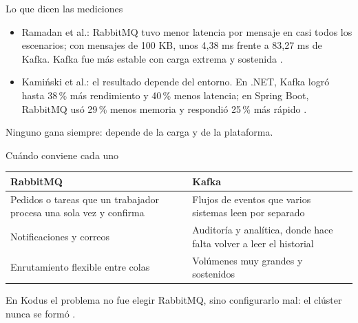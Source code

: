 \begin{frame}{Lo que dicen las mediciones}
  \begin{itemize}
    \item Ramadan et al.: RabbitMQ tuvo menor latencia por mensaje en casi todos los escenarios; con mensajes de 100 KB, unos 4,38 ms frente a 83,27 ms de Kafka. Kafka fue más estable con carga extrema y sostenida \cite{rias2026kafka}.
    \item Kamiński et al.: el resultado depende del entorno. En .NET, Kafka logró hasta 38\,\% más rendimiento y 40\,\% menos latencia; en Spring Boot, RabbitMQ usó 29\,\% menos memoria y respondió 25\,\% más rápido \cite{kaminski2025rabbitmq}.
  \end{itemize}
  \vspace{0.3cm}
  Ninguno gana siempre: depende de la carga y de la plataforma.
\end{frame}

\begin{frame}{Cuándo conviene cada uno}
  \begin{tabularx}{\textwidth}{XX}
    \toprule
    RabbitMQ & Kafka \\
    \midrule
    Pedidos o tareas que un trabajador procesa una sola vez y confirma & Flujos de eventos que varios sistemas leen por separado \\
    Notificaciones y correos & Auditoría y analítica, donde hace falta volver a leer el historial \\
    Enrutamiento flexible entre colas & Volúmenes muy grandes y sostenidos \\
    \bottomrule
  \end{tabularx}
  \vspace{0.3cm}
  {\small En Kodus el problema no fue elegir RabbitMQ, sino configurarlo mal: el clúster nunca se formó \cite{malinosqui2026kodus}.}
\end{frame}
